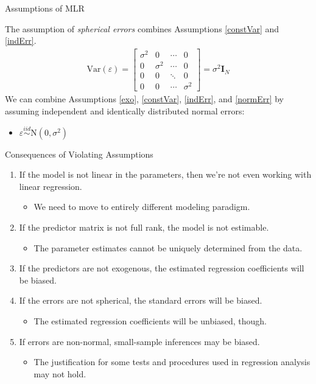 \documentclass[10pt]{beamer}\usepackage[]{graphicx}\usepackage[]{color}
\begin{document}
\begin{frame}[allowframebreaks]{Assumptions of MLR}
  \pagebreak

  The assumption of \emph{spherical errors} combines Assumptions \ref{constVar}
  and \ref{indErr}.
  \begin{align*}
    \textrm{Var}(\varepsilon) =
    \begin{bmatrix}
      \sigma^2 & 0 & \cdots & 0\\
      0 & \sigma^2 & \cdots & 0\\
      0 & 0 & \ddots & 0\\
      0 & 0 & \cdots & \sigma^2
    \end{bmatrix} =
    \sigma^2\mathbf{I}_N
  \end{align*}
  We can combine Assumptions \ref{exo}, \ref{constVar}, \ref{indErr}, and
  \ref{normErr} by assuming independent and identically distributed normal
  errors:
  \begin{itemize}
  \item $\varepsilon \overset{iid}{\sim} \textrm{N}(0, \sigma^2)$
  \end{itemize}

\end{frame}


\begin{frame}{Consequences of Violating Assumptions}

  \begin{enumerate}
  \item If the model is not linear in the parameters, then we're not even
    working with linear regression.
    \begin{itemize}
    \item We need to move to entirely different modeling paradigm.
    \end{itemize}
    \vb
  \item If the predictor matrix is not full rank, the model is not estimable.
    \begin{itemize}
    \item The parameter estimates cannot be uniquely determined from the data.
    \end{itemize}
    \vb
  \item If the predictors are not exogenous, the estimated regression
    coefficients will be biased.
    \vb
  \item If the errors are not spherical, the standard errors will be biased.
    \begin{itemize}
    \item The estimated regression coefficients will be unbiased, though.
    \end{itemize}
    \vb
  \item If errors are non-normal, small-sample inferences may be biased.
    \begin{itemize}
    \item The justification for some tests and procedures used in regression
      analysis may not hold.
    \end{itemize}
  \end{enumerate}

\end{frame}
\end{document}
